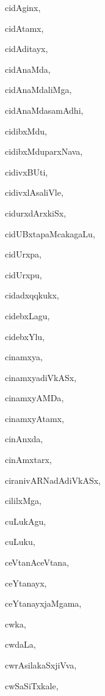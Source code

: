 \begin{multicols}{2}
{cidAginx}, \pageref{cidAginx}

{cidAtamx}, \pageref{cidAtamx}

{cidAditayx}, \pageref{cidAditayx}

{cidAnaMda}, \pageref{cidAnaMda}

{cidAnaMdaliMga}, \pageref{cidAnaMdaliMga}

{cidAnaMdasamAdhi}, \pageref{cidAnaMdasamAdhi}

{cidibxMdu}, \pageref{cidibxMdu}

{cidibxMduparxNava}, \pageref{cidibxMduparxNava}

{cidivxBUti}, \pageref{cidivxBUti}

{cidivxlAsaliVle}, \pageref{cidivxlAsaliVle}

{cidurxdArxkiSx}, \pageref{cidurxdArxkiSx}

{cidUBxtapaMcakagaLu}, \pageref{cidUBxtapaMcakagaLu}

{cidUrxpa}, \pageref{cidUrxpa}

{cidUrxpu}, \pageref{cidUrxpu}

{cidadxqqkukx}, \pageref{cidadxqqkukx}

{cidebxLagu}, \pageref{cidebxLagu}

{cidebxYlu}, \pageref{cidebxYlu}

{cinamxya}, \pageref{cinamxya}

{cinamxyadiVkASx}, \pageref{cinamxyadiVkASx}

{cinamxyAMDa}, \pageref{cinamxyAMDa}

{cinamxyAtamx}, \pageref{cinamxyAtamx}

{cinAnxda}, \pageref{cinAnxda}

{cinAmxtarx}, \pageref{cinAmxtarx}

{ciranivARNadAdiVkASx}, \pageref{ciranivARNadAdiVkASx}

{cililxMga}, \pageref{cililxMga}

{cuLukAgu}, \pageref{cuLukAgu}

{cuLuku}, \pageref{cuLuku}

{ceVtanAceVtana}, \pageref{ceVtanAceVtana}

{ceYtanayx}, \pageref{ceYtanayx}

{ceYtanayxjaMgama}, \pageref{ceYtanayxjaMgama}

{cwka}, \pageref{cwka}

{cwdaLa}, \pageref{cwdaLa}

{cwrAsilakaSxjiVva}, \pageref{cwrAsilakaSxjiVva}

{cwSaSiTxkale}, \pageref{cwSaSiTxkale}


\end{multicols}
